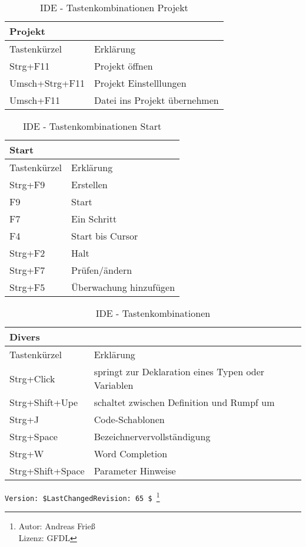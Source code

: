 \begin{table}[htbp]
		\begin{tabular}[ht]{|l|l|}
      \hline
      Projekt & \\
      \hline
      Tastenkürzel & Erklärung \\
      \hline
      Strg+F11 & Projekt öffnen\\
      Umsch+Strg+F11 & Projekt Einstelllungen\\
      Umsch+F11 & Datei ins Projekt übernehmen\\
      \hline
		\end{tabular}
  \caption{IDE - Tastenkombinationen Projekt}
  \label{tab:IDETastenkombDivProjekt} 
\end{table}
\begin{table}[htbp]
		\begin{tabular}[ht]{|l|l|}
      \hline
      Start & \\
      \hline
      Tastenkürzel & Erklärung \\
      \hline
      Strg+F9 & Erstellen\\
      F9 & Start\\
      F7 & Ein Schritt\\
      F4 & Start bis Cursor\\
      Strg+F2 & Halt \\
      Strg+F7 & Prüfen/ändern\\
      Strg+F5 & Überwachung hinzufügen\\
      \hline
		\end{tabular}
  \caption{IDE - Tastenkombinationen Start}
  \label{tab:IDETastenkombStart} 
\end{table}
\begin{table}[htbp]
		\begin{tabular}[ht]{|l|l|}
      \hline
      Divers & \\
      \hline
      Tastenkürzel & Erklärung \\
      \hline
      Strg+Click & springt zur Deklaration eines Typen oder Variablen \\
      Strg+Shift+Upe & schaltet zwischen Definition und Rumpf um \\
      Strg+J & Code-Schablonen \\
      Strg+Space & Bezeichnervervollständigung \\
      Strg+W & Word Completion \\
      Strg+Shift+Space & Parameter Hinweise \\
      \hline
		\end{tabular}
  \caption{IDE - Tastenkombinationen}
  \label{tab:IDETastenkombDiv} 
\end{table}
\verb|Version: $LastChangedRevision: 65 $ |\footnote{ Autor: Andreas Frieß\\Lizenz: GFDL}